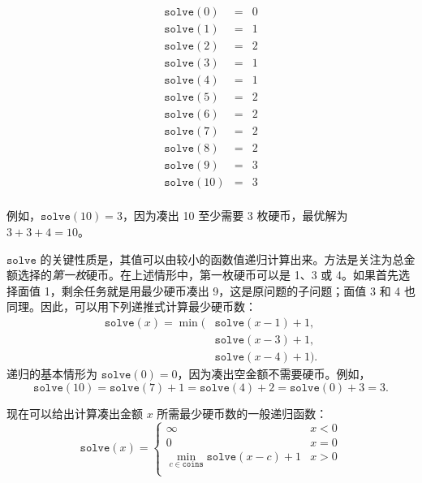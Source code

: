 \[
\begin{array}{lcl}
\texttt{solve}(0) & = & 0 \\
\texttt{solve}(1) & = & 1 \\
\texttt{solve}(2) & = & 2 \\
\texttt{solve}(3) & = & 1 \\
\texttt{solve}(4) & = & 1 \\
\texttt{solve}(5) & = & 2 \\
\texttt{solve}(6) & = & 2 \\
\texttt{solve}(7) & = & 2 \\
\texttt{solve}(8) & = & 2 \\
\texttt{solve}(9) & = & 3 \\
\texttt{solve}(10) & = & 3 \\
\end{array}
\]

例如，$\texttt{solve}(10)=3$，因为凑出 10 至少需要 3 枚硬币，最优解为 $3+3+4=10$。

$\texttt{solve}$ 的关键性质是，其值可以由较小的函数值递归计算出来。方法是关注为总金额选择的\emph{第一枚}硬币。在上述情形中，第一枚硬币可以是 1、3 或 4。如果首先选择面值 1，剩余任务就是用最少硬币凑出 9，这是原问题的子问题；面值 3 和 4 也同理。因此，可以用下列递推式计算最少硬币数：
\begin{equation*}
\begin{split}
\texttt{solve}(x) = \min( & \texttt{solve}(x-1)+1, \\
                           & \texttt{solve}(x-3)+1, \\
                           & \texttt{solve}(x-4)+1).
\end{split}
\end{equation*}
递归的基本情形为 $\texttt{solve}(0)=0$，因为凑出空金额不需要硬币。例如，
\[ \texttt{solve}(10) = \texttt{solve}(7)+1 = \texttt{solve}(4)+2 = \texttt{solve}(0)+3 = 3.\]

现在可以给出计算凑出金额 $x$ 所需最少硬币数的一般递归函数：
\begin{equation*}
    \texttt{solve}(x) = \begin{cases}
               \infty               & x < 0\\
               0               & x = 0\\
               \min_{c \in \texttt{coins}} \texttt{solve}(x-c)+1 & x > 0 \\
           \end{cases}
\end{equation*}

